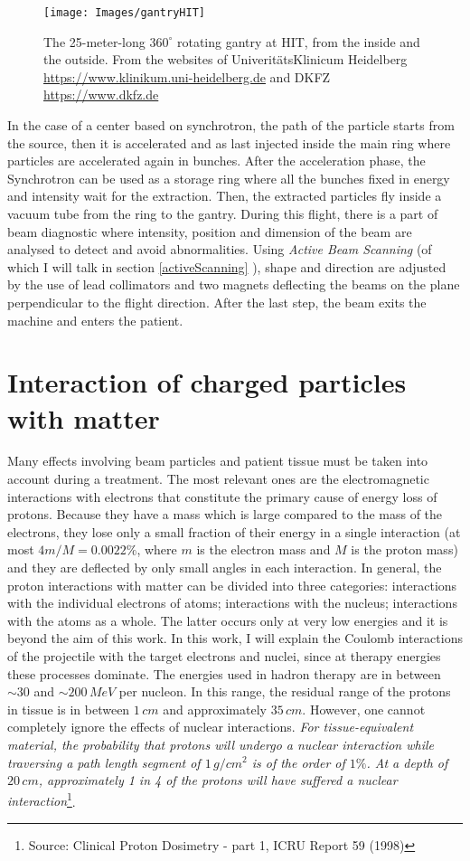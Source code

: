 \documentclass[12pt, a4paper, twoside]{book}
\begin{document}
\begin{figure}[t]
\texttt{[image: Images/gantryHIT]}
\caption{The 25-meter-long $360^\circ$ rotating gantry at HIT, from the inside and the outside. From the websites of Univerit\"atsKlinicum Heidelberg \url{https://www.klinikum.uni-heidelberg.de} and DKFZ \url{https://www.dkfz.de}}
\label{fig:HIT}
\end{figure}

In the case of a center based on synchrotron, the path of the particle starts from the source, then it is accelerated and as last injected inside the main ring where particles are accelerated again in bunches. After the acceleration phase, the Synchrotron can be used as a storage ring where all the bunches fixed in energy and intensity wait for the extraction. Then, the extracted particles fly inside a vacuum tube from the ring to the gantry. During this flight, there is a part of beam diagnostic where intensity, position and dimension of the beam are analysed to detect and avoid abnormalities. Using \emph{Active Beam Scanning} (of which I will talk in section \ref{activeScanning} ), shape and direction are adjusted by the use of lead collimators and two magnets deflecting the beams on the plane perpendicular to the flight direction. After the last step, the beam exits the machine and enters the patient.

\section{Interaction of charged particles with matter}
Many effects involving beam particles and patient tissue must be taken into account during a treatment.
The most relevant ones are the electromagnetic interactions with electrons that constitute the primary cause of energy loss of protons. Because they have a mass which is large compared to the mass of the electrons, they lose only a small fraction of their energy in a single interaction (at most $4 m/M = 0.0022\%$, where $m$ is the electron mass and $M$ is the proton mass) and they are deflected by only small angles in each interaction.
In general, the proton interactions with matter can be divided into three categories: interactions with the individual electrons of atoms; interactions with the nucleus; interactions with the atoms as a whole. The latter occurs only at very low energies and it is beyond the aim of this work. In this work, I will explain the Coulomb interactions of the projectile with the target electrons and nuclei, since at therapy energies these processes dominate.  
The energies used in hadron therapy are in between $\sim30$ and $\sim200\,MeV$ per nucleon. 
In this range, the residual range of the protons in tissue is in between $1\,cm$ and approximately $35\,cm$. However, one cannot completely ignore the effects of nuclear interactions. \emph{For tissue-equivalent material, the probability that protons will undergo a nuclear interaction while traversing a path length segment of $1\,g/cm^{2}$ is of the order of $1\%$. At a depth of $20\,cm$, approximately 1 in 4 of the protons will have suffered a nuclear interaction}\footnote{Source: Clinical Proton Dosimetry - part 1, ICRU Report 59 (1998)}. 
\end{document}
